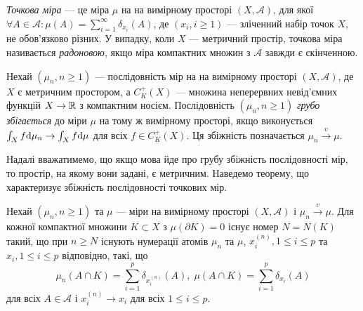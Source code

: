 \begin{definition}
    \emph{Точкова міра} --- це міра $\mu$ на 
    на вимірному просторі $\left(X, \mathcal{A}\right)$,
    для якої $\forall A \in \mathcal{A}: \mu(A) = \sum_{i=1}^{\infty} \delta_{x_i}(A)$,
    де $\left(x_i, i \geq 1\right)$ --- зліченний набір точок $X$, не обов'язково різних.
    У випадку, коли $X$ --- метричний простір, точкова міра називається \emph{радоновою},
    якщо міра компактних множин з $\mathcal{A}$ завжди є скінченною.
\end{definition}
\begin{definition}
    Нехай $\left(\mu_n, n \geq 1\right)$ --- послідовність мір на
    на вимірному просторі $\left(X, \mathcal{A}\right)$,
    де $X$ є метричним простором,
    а $C_K^+(X)$ --- множина неперервних невід'ємних функцій
    $X \to \mathbb{R}$ з компактним носієм.
    Послідовність $\left(\mu_n, n \geq 1\right)$
    \emph{грубо збігається} до міри $\mu$ на тому ж вимірному просторі,
    якщо виконується $\int_X f \mathrm{d}\mu_n \to \int_X f \mathrm{d}\mu$ для всіх $f \in C_K^+(X)$.
    Ця збіжність позначається $\mu_n \overset{v}{\longrightarrow} \mu$.
\end{definition}

Надалі вважатимемо, що якщо мова йде про
грубу збіжність послідовності мір, то простір, на якому вони задані,
є метричним.
Наведемо теорему, що характеризує збіжність послідовності точкових мір.
\begin{theorem}
    Нехай $\left(\mu_n, n \geq 1\right)$ та $\mu$ --- міри
    на вимірному просторі $\left(X, \mathcal{A}\right)$ і
    $\mu_n \overset{v}{\longrightarrow} \mu$. Для кожної компактної множини
    $K \subset X$ з $\mu(\partial K) = 0$ існує номер $N = N(K)$ такий,
    що при $n \geq N$ існують нумерації атомів $\mu_n$ та 
    $\mu$, $x_i^{(n)}, 1 \leq i \leq p$ та $x_i, 1 \leq i \leq p$ відповідно, такі, що
    $$
        \mu_n(A \cap K) = \sum_{i=1}^p \delta_{x_i^{(n)}} (A), \;
        \mu(A \cap K) = \sum_{i=1}^p \delta_{x_i} (A)
    $$
    для всіх $A \in \mathcal{A}$ і $x_i^{(n)} \to x_i$ для всіх $1 \leq i \leq p$.
\end{theorem}